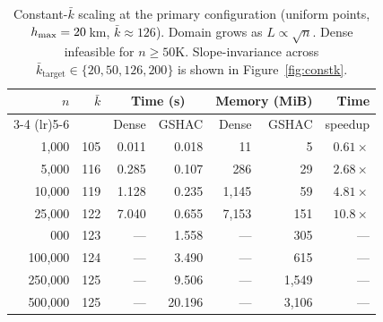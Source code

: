 \begin{table}[t]
\caption{Constant-\(\bar{k}\) scaling at the primary
  configuration (uniform points, \(h_{\max} = 20\)\,km,
  \(\bar{k} \approx 126\)). Domain grows as
  \(L \propto \sqrt{n}\). Dense infeasible for
  \(n \geq 50\text{K}\). Slope-invariance across
  \(\bar{k}_{\text{target}} \in \{20, 50, 126, 200\}\)
  is shown in Figure~\ref{fig:constk}.}
\label{tab:constk}
\small
\begin{tabular}{rrrrrrr}
\toprule
\(n\) & \(\bar{k}\) & \multicolumn{2}{c}{Time (s)} & \multicolumn{2}{c}{Memory (MiB)} & Time \\
\cmidrule(lr){3-4} \cmidrule(lr){5-6}
 &  & Dense & GSHAC & Dense & GSHAC & speedup \\
\midrule
1{,}000 & 105 & 0.011 & 0.018 & 11 & 5 & $0.61\times$ \\
5{,}000 & 116 & 0.285 & 0.107 & 286 & 29 & $2.68\times$ \\
10{,}000 & 119 & 1.128 & 0.235 & 1{,}145 & 59 & $4.81\times$ \\
25{,}000 & 122 & 7.040 & 0.655 & 7{,}153 & 151 & $\mathbf{10.8\times}$ \\
\addlinespace
50{,}000 & 123 & --- & 1.558 & --- & 305 & --- \\
100{,}000 & 124 & --- & 3.490 & --- & 615 & --- \\
250{,}000 & 125 & --- & 9.506 & --- & 1{,}549 & --- \\
500{,}000 & 125 & --- & 20.196 & --- & 3{,}106 & --- \\
\bottomrule
\end{tabular}
\end{table}
